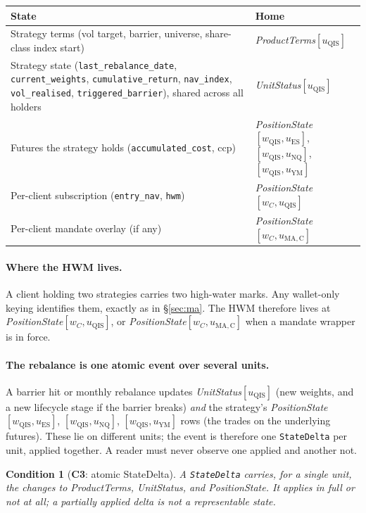 \documentclass[11pt,a4paper]{article}
\newtheorem{condition}[definition]{Condition}
\begin{document}
\begin{longtable}{p{8.6cm}p{6.0cm}}
\toprule
\textbf{State} & \textbf{Home} \\
\midrule
Strategy terms (vol target, barrier, universe, share-class index start) &
\emph{ProductTerms}$[u_{\mathrm{QIS}}]$ \\
Strategy state (\texttt{last\_rebalance\_date}, \texttt{current\_weights},
\texttt{cumulative\_return}, \texttt{nav\_index}, \texttt{vol\_realised},
\texttt{triggered\_barrier}), shared across all holders &
\emph{UnitStatus}$[u_{\mathrm{QIS}}]$ \\
Futures the strategy holds (\texttt{accumulated\_cost}, ccp) &
\emph{PositionState}$[w_{\mathrm{QIS}},u_{\mathrm{ES}}]$, $[w_{\mathrm{QIS}},u_{\mathrm{NQ}}]$,
$[w_{\mathrm{QIS}},u_{\mathrm{YM}}]$ \\
Per-client subscription (\texttt{entry\_nav}, \texttt{hwm}) &
\emph{PositionState}$[w_C,u_{\mathrm{QIS}}]$ \\
Per-client mandate overlay (if any) &
\emph{PositionState}$[w_C,u_{\mathrm{MA,C}}]$ \\
\bottomrule
\end{longtable}

\paragraph{Where the HWM lives.}
A client holding two strategies carries two high-water marks. Any wallet-only keying
identifies them, exactly as in \S\ref{sec:ma}. The HWM therefore lives at
\emph{PositionState}$[w_C,u_{\mathrm{QIS}}]$, or
\emph{PositionState}$[w_C,u_{\mathrm{MA,C}}]$ when a mandate wrapper is in force.

\paragraph{The rebalance is one atomic event over several units.}
A barrier hit or monthly rebalance updates \emph{UnitStatus}$[u_{\mathrm{QIS}}]$ (new
weights, and a new lifecycle stage if the barrier breaks) \emph{and} the strategy's
\emph{PositionState}$[w_{\mathrm{QIS}},u_{\mathrm{ES}}]$,
$[w_{\mathrm{QIS}},u_{\mathrm{NQ}}]$, $[w_{\mathrm{QIS}},u_{\mathrm{YM}}]$ rows (the trades on
the underlying futures). These lie on different units; the event is therefore one
\texttt{StateDelta} per unit, applied together. A reader must never observe one applied and
another not.

\begin{condition}[\textbf{C3}: atomic StateDelta]
A \texttt{StateDelta} carries, for a single unit, the changes to \emph{ProductTerms},
\emph{UnitStatus}, and \emph{PositionState}. It applies in full or not at all; a partially
applied delta is not a representable state.
\end{condition}
\end{document}
